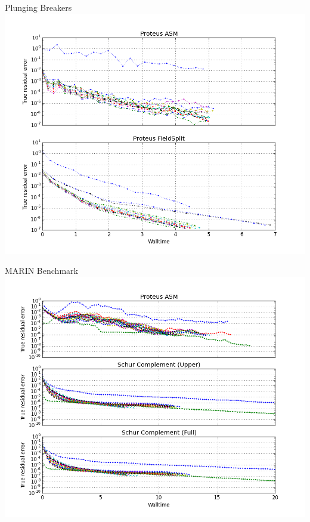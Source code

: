 \documentclass{beamer}
\begin{document}
\begin{frame}{Plunging Breakers}
    \includegraphics[width=\textwidth]{figures/plunging_comparison.png}
\end{frame}

\begin{frame}{MARIN Benchmark}
    \includegraphics[width=\textwidth]{figures/marin_comparison.png}
\end{frame}
\end{document}
